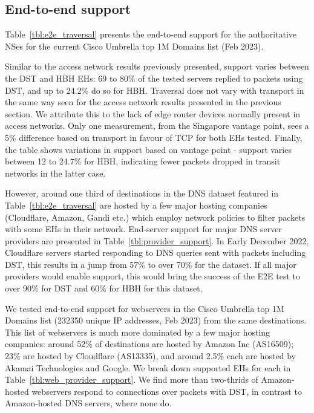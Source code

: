 \documentclass[conference]{IEEEtran}
\begin{document}
\subsection{End-to-end support}
\label{subsec:e2esupport}

Table~\ref{tbl:e2e_traversal} presents the end-to-end support for the authoritative NSes for the current Cisco Umbrella top 1M Domains list (Feb 2023).

Similar to the access network results previously presented, support varies between the DST and HBH EHs: 69 to 80\% of the tested servers replied to packets using DST, and up to 24.2\% do so for HBH. Traversal does not vary with transport in the same way seen for the access network results presented in the previous section. We attribute this to the lack of edge router devices normally present in access networks. Only one measurement, from the Singapore vantage point, sees a 5\% difference based on transport in favour of TCP for both EHs tested.
Finally, the table shows variations in support based on vantage point - support varies between 12 to 24.7\% for HBH, indicating fewer packets dropped in transit networks in the latter case.

However, around one third of destinations in the DNS dataset featured in Table~\ref{tbl:e2e_traversal} are hosted by a few major hosting companies (Cloudflare, Amazon, Gandi etc.) which employ network policies to filter packets with some EHs in their network. End-server support for major DNS server providers are presented in Table~\ref{tbl:provider_support}. In Early December 2022, Cloudflare servers started responding to DNS queries sent with packets including DST, this results in a jump from 57\% to over 70\% for the dataset. If all major providers would enable support, this would bring the success of the E2E test to over 90\% for DST and 60\% for HBH for this dataset.

We tested end-to-end support for webservers in the Cisco Umbrella top 1M Domains list (232350 unique IP addresses, Feb 2023) from the same destinations. This list of webservers is much more dominated by a few major hosting companies: around 52\% of destinations are hosted by Amazon Inc (AS16509); 23\% are hosted by Cloudflare (AS13335), and around 2.5\% each are hosted by Akamai Technologies and Google. We break down supported EHs for each in Table~\ref{tbl:web_provider_support}. We find more than two-thrids of Amazon-hosted webservers respond to connections over packets with DST, in contrast to Amazon-hosted DNS servers, where none do. 
\end{document}

